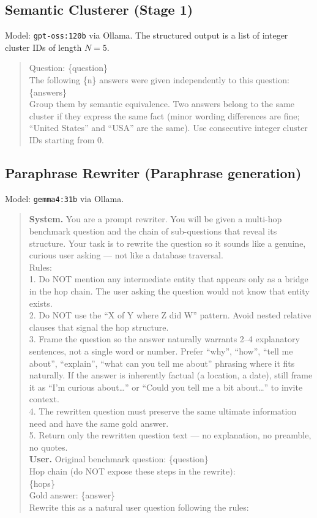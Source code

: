 \documentclass[10pt,letterpaper]{article}
\begin{document}
\subsection{Semantic Clusterer (Stage 1)}
Model: \texttt{gpt-oss:120b} via Ollama. The structured output is a list of integer
cluster IDs of length $N=5$.

\begin{quote}\sloppy\footnotesize\ttfamily
Question: \{question\}\\[3pt]
The following \{n\} answers were given independently to this question:\\
\{answers\}\\[3pt]
Group them by semantic equivalence. Two answers belong to the same cluster if they
express the same fact (minor wording differences are fine; ``United States'' and
``USA'' are the same). Use consecutive integer cluster IDs starting from 0.
\end{quote}

\subsection{Paraphrase Rewriter (Paraphrase generation)}
Model: \texttt{gemma4:31b} via Ollama.

\begin{quote}\sloppy\footnotesize\ttfamily
\textbf{System.} You are a prompt rewriter. You will be given a multi-hop benchmark
question and the chain of sub-questions that reveal its structure. Your task is to
rewrite the question so it sounds like a genuine, curious user asking --- not like a
database traversal.\\[3pt]
Rules:\\
1. Do NOT mention any intermediate entity that appears only as a bridge in the hop
chain. The user asking the question would not know that entity exists.\\
2. Do NOT use the ``X of Y where Z did W'' pattern. Avoid nested relative clauses that
signal the hop structure.\\
3. Frame the question so the answer naturally warrants 2--4 explanatory sentences,
not a single word or number. Prefer ``why'', ``how'', ``tell me about'', ``explain'',
``what can you tell me about'' phrasing where it fits naturally. If the answer is
inherently factual (a location, a date), still frame it as ``I'm curious about\ldots''
or ``Could you tell me a bit about\ldots'' to invite context.\\
4. The rewritten question must preserve the same ultimate information need and have
the same gold answer.\\
5. Return only the rewritten question text --- no explanation, no preamble, no quotes.
\\[6pt]
\textbf{User.} Original benchmark question: \{question\}\\[3pt]
Hop chain (do NOT expose these steps in the rewrite):\\
\{hops\}\\[3pt]
Gold answer: \{answer\}\\[3pt]
Rewrite this as a natural user question following the rules:
\end{quote}
\end{document}
